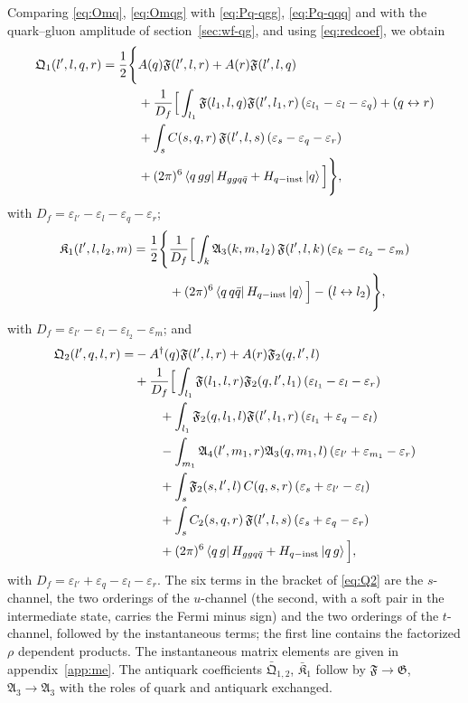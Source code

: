 \documentclass[11pt,a4paper]{article}
\numberwithin{equation}{section}
\newcommand{\mf}[1]{\mathfrak{#1}}
\newcommand{\eps}{\varepsilon}
\newcommand{\dg}{\dagger}
\newcommand{\ket}[1]{\left|#1\right\rangle}
\newcommand{\bra}[1]{\left\langle#1\right|}
\begin{document}
Comparing \eqref{eq:Omq}, \eqref{eq:Omqg} with \eqref{eq:Pq-qgg}, \eqref{eq:Pq-qqq} and with the
quark--gluon amplitude of section~\ref{sec:wf-qg}, and using \eqref{eq:redcoef}, we obtain
\begin{align}
\mf Q_{1}(l',l,q,r)=\frac12\Bigg\{&A(q)\mf F(l',l,r)+A(r)\mf F(l',l,q)
\nonumber\\&+\frac{1}{D_{f}}\Big[\int_{l_{1}}\mf F(l_{1},l,q)\mf F(l',l_{1},r)\,(\eps_{l_{1}}-\eps_{l}-\eps_{q})+(q\leftrightarrow r)
\nonumber\\
&+\int_{s}C(s,q,r)\,\mf F(l',l,s)\,(\eps_{s}-\eps_{q}-\eps_{r})
\nonumber\\&+(2\pi)^{6}\bra{q\,gg}H_{ggq\bar q}+H_{q-{\rm inst}}\ket{q}\Big]\Bigg\},
\label{eq:Q1}
\end{align}
with $D_{f}=\eps_{l'}-\eps_{l}-\eps_{q}-\eps_{r}$;
\begin{align}
\mf K_{1}(l',l,l_{2},m)=\frac12\Bigg\{&\frac{1}{D_{f}}\Big[\int_{k}\mf A_{3}(k,m,l_{2})\,\mf F(l',l,k)\,(\eps_{k}-\eps_{l_{2}}-\eps_{m})
\nonumber\\&+(2\pi)^{6}\bra{q\,q\bar q}H_{q-{\rm inst}}\ket{q}\Big]-\big(l\leftrightarrow l_{2}\big)\Bigg\},
\label{eq:K1}
\end{align}
with $D_{f}=\eps_{l'}-\eps_{l}-\eps_{l_{2}}-\eps_{m}$; and
\begin{align}
\mf Q_{2}(l',q,l,r)=&-A^{\dg}(q)\mf F(l',l,r)+A(r)\mf F_{2}(q,l',l)
\nonumber\\
&+\frac{1}{D_{f}}\Big[\int_{l_{1}}\mf F(l_{1},l,r)\mf F_{2}(q,l',l_{1})\,(\eps_{l_{1}}-\eps_{l}-\eps_{r})
\nonumber\\&\qquad+\int_{l_{1}}\mf F_{2}(q,l_{1},l)\mf F(l',l_{1},r)\,(\eps_{l_{1}}+\eps_{q}-\eps_{l})
\nonumber\\
&\qquad-\int_{m_{1}}\mf A_{4}(l',m_{1},r)\mf A_{3}(q,m_{1},l)\,(\eps_{l'}+\eps_{m_{1}}-\eps_{r})
\nonumber\\&\qquad+\int_{s}\mf F_{2}(s,l',l)\,C(q,s,r)\,(\eps_{s}+\eps_{l'}-\eps_{l})
\nonumber\\
&\qquad+\int_{s}C_{2}(s,q,r)\,\mf F(l',l,s)\,(\eps_{s}+\eps_{q}-\eps_{r})
\nonumber\\&\qquad+(2\pi)^{6}\bra{q\,g}H_{ggq\bar q}+H_{q-{\rm inst}}\ket{q\,g}\Big],
\label{eq:Q2}
\end{align}
with $D_{f}=\eps_{l'}+\eps_{q}-\eps_{l}-\eps_{r}$. The six terms in the bracket of \eqref{eq:Q2} are the
$s$-channel, the two orderings of the $u$-channel (the second, with a soft pair in the intermediate
state, carries the Fermi minus sign) and the two orderings of the $t$-channel, followed by the
instantaneous terms; the first line contains the factorized $\rho$ dependent products. The
instantaneous matrix elements are given in appendix~\ref{app:me}. The antiquark coefficients
$\bar{\mf Q}_{1,2}$, $\bar{\mf K}_{1}$ follow by $\mf F\to\mf G$, $\mf A_{3}\to\mf A_{3}$ with the roles of
quark and antiquark exchanged.
\end{document}
